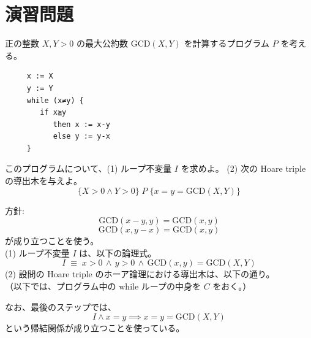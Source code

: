\documentclass[
		head_space=20mm,
		foot_space=20mm,
		gutter=10mm,
		line_length=190mm
]{jlreq}
\begin{document}
\section*{演習問題}

\begin{practice}[ループ不変量]
	正の整数 $X,Y>0$ の最大公約数 $\mathrm{GCD}(X,Y)$ を計算するプログラム $P$ を考える。
	\begin{verbatim}
	 x := X
	 y := Y
	 while (x≠y) {
	    if x≧y
	       then x := x-y
	       else y := y-x
	 }\end{verbatim}
	このプログラムについて、(1) ループ不変量 $I$ を求めよ。 (2) 次の Hoare triple の導出木を与えよ。\[\{X>0\land Y>0\}\;P\;\{x=y=\mathrm{GCD}(X,Y)\}\]
\end{practice}

\begin{answer}
	方針: 
	\[\mathrm{GCD}(x-y,y)=\mathrm{GCD}(x,y)\]
	\[\mathrm{GCD}(x,y-x)=\mathrm{GCD}(x,y)\]
	が成り立つことを使う。\vspace{5pt}
	\\
	(1) ループ不変量 $I$ は、以下の論理式。\[I\;\equiv\;x>0 \,\land\, y>0 \,\land\, \mathrm{GCD}(x,y)=\mathrm{GCD}(X,Y)\]
	(2) 設問の Hoare triple のホーア論理における導出木は、以下の通り。\\（以下では、プログラム中の while ループの中身を $C$ をおく。）
	\begin{prooftree}
	\end{prooftree}
	なお、最後のステップでは、\[I\land x=y\implies x=y=\mathrm{GCD}(X,Y)\] という帰結関係が成り立つことを使っている。
\end{answer}
\end{document}
